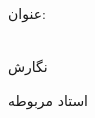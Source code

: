 \begin{center}
\begin{large}
\end{large}

\vspace{1.5cm}

{عنوان:}\\[1.2em]
{\LARGE\textbf{\ThesisTitle}}\\ 
\vspace{1cm}

\vspace{2cm}

{نگارش}\\[.5em]
{\large\textbf{\ThesisAuthor}}

\vspace{1.5cm}

{استاد مربوطه}\\[.5em]
{\large\textbf{\ThesisSupervisor}}

\vspace{1cm}



\vspace{2cm}

\ThesisDate

\end{center}

\newpage
